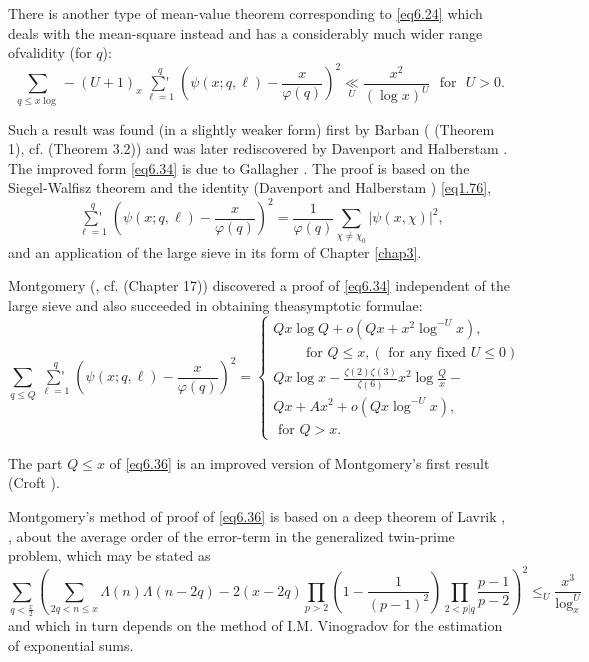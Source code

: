 There is another type of mean-value theorem corresponding to \eqref{eq6.24}
which deals with the mean-square instead and has a considerably much
wider range of\pageoriginale validity (for $q$): 
\begin{equation*}
\sum_{q\leq x \log} -(U + 1)_x \mathop{\sum{}'}\limits_{\ell = 1}^{q}
(\psi (x;q,\ell) 
- \frac{x}{\varphi (q)})^2 \underset{U}{\ll} \frac{x^2}{(\log x)^U}
\text{~ for~ } U > 0. \tag{6.34}\label{eq6.34} 
\end{equation*}

Such a result was found (in a slightly weaker form) first by Barban
(\cite{key6} (Theorem 1), cf. \cite{key10} (Theorem 3.2)) and was later
rediscovered by Davenport and Halberstam \cite{key2}. The improved form
\eqref{eq6.34} is due to Gallagher \cite{key1}. The proof is based on the
Siegel-Walfisz theorem and the identity (Davenport and Halberstam
\cite{key2}) \eqref{eq1.76}, 
\begin{equation*}
\mathop{\sum{}'}\limits_{\ell = 1}^{q} (\psi (x;q,\ell ) -
\frac{x}{\varphi (q)})^2 = 
\frac{1}{\varphi (q)} \sum_{\chi \neq \chi_0} | \psi (x,\chi ) |^2,
\tag{6.35}\label{eq6.35}  
\end{equation*}
and an application of the large sieve in its form of Chapter \ref{chap3}.

Montgomery (\cite{key4}, cf. \cite{key5} (Chapter 17)) discovered a
proof of \eqref{eq6.34} independent of the large sieve and also
succeeded in obtaining the\break asymptotic formulae: 
{\fontsize{10}{12}\selectfont
\begin{equation*} 
\sum_{q \leq Q} \mathop{\sum{}'}\limits_{\ell = 1}^{q}(\psi (x;q,\ell
) - \frac{x}{\varphi (q)})^2 =  
\begin{cases}
Qx \log Q + o (Qx+x^2 \log^{-U}x),\\
\qquad \text{ for } Q \leq x,(\text{ for any fixed } U \leq 0)\\
Qx \log x - \frac{\zeta (2)\zeta(3)}{\zeta (6)}x^2 \log \frac{Q}{x}-\\
Qx + Ax^2 + o(Qx \log^{-U}x),\\
\text{ for } Q > x.
\end{cases} \tag{6.36}\label{eq6.36} 
\end{equation*}}

The part $Q\leq x$ of \eqref{eq6.36} is an improved version of Montgomery's
first result (Croft \cite{key1}). 

Montgomery's method of proof of \eqref{eq6.36} is based on a deep theorem of
Lavrik \cite{key1}, \cite{key2}, about the average order of the
error-term in the generalized twin-prime problem, which may be stated as 
{\fontsize{10}{12}\selectfont
\begin{equation*}
\sum_{q < \frac{x}{2}} (\sum_{2q < n \leq x} \Lambda (n)\Lambda (n-2q)
-2 (x -2q) \prod_{p>2} (1-\frac{1}{(p-1)^2})\prod_{2<
  p|q}\frac{p-1}{p-2})^2 \leq_{{}U} \frac{x^3}{\log^{U}_x}
\tag{6.37}\label{eq6.37}  
\end{equation*}}
and which in turn depends on the method of I.M. Vinogradov for the
estimation of exponential sums. 

